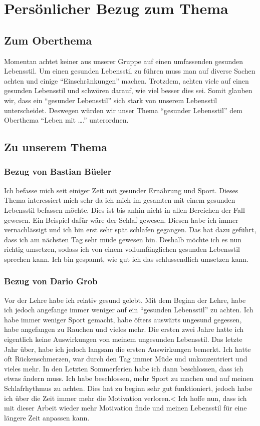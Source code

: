 \chapter{Persönlicher Bezug zum Thema}
\section{Zum Oberthema}
Momentan achtet keiner aus unserer Gruppe auf einen umfassenden gesunden Lebensstil.
Um einen gesunden Lebensstil zu führen muss man auf diverse Sachen achten und einige “Einschränkungen” machen. Trotzdem, achten viele auf einen gesunden Lebensstil und schwören darauf, wie viel besser dies sei. 
Somit glauben wir, dass ein “gesunder Lebensstil” sich stark von unserem Lebensstil unterscheidet. Deswegen würden wir unser Thema “gesunder Lebensstil” dem Oberthema “Leben mit ….” unterordnen.
\section{Zu unserem Thema}
\subsection{Bezug von Bastian Büeler}
Ich befasse mich seit einiger Zeit mit gesunder Ernährung und Sport. Dieses Thema interessiert mich sehr da ich mich im gesamten mit einem gesunden Lebensstil befassen möchte. Dies ist bis anhin nicht in allen Bereichen der Fall gewesen. Ein Beispiel dafür wäre der Schlaf gewesen. Diesen habe ich immer vernachlässigt und ich bin erst sehr spät schlafen gegangen. Das hat dazu geführt, dass ich am nächsten Tag sehr müde gewesen bin. Deshalb möchte ich es nun richtig umsetzen, sodass ich von einem vollumfänglichen gesunden Lebensstil sprechen kann. Ich bin gespannt, wie gut ich das schlussendlich umsetzen kann.
\subsection{Bezug von Dario Grob}
Vor der Lehre habe ich relativ gesund gelebt. Mit dem Beginn der Lehre, habe ich jedoch angefange immer weniger auf ein “gesunden Lebensstil” zu achten.
\newline
Ich habe immer weniger Sport gemacht, habe öfters auswärts ungesund gegessen, habe angefangen zu Rauchen und vieles mehr. 
\newline
Die ersten zwei Jahre hatte ich eigentlich keine Auswirkungen von meinem ungesunden Lebensstil. 
\newline
Das letzte Jahr über, habe ich jedoch langsam die ersten Auswirkungen bemerkt. Ich hatte oft Rückenschmerzen, war durch den Tag immer Müde und unkonzentriert und vieles mehr.
\newline
In den Letzten Sommerferien habe ich dann beschlossen, dass ich etwas ändern muss. Ich habe beschlossen, mehr Sport zu machen und auf meinen Schlafrhythmus zu achten. 
\newline
Dies hat zu beginn sehr gut funktioniert, jedoch habe ich über die Zeit immer mehr die Motivation verloren.<
\newline
Ich hoffe nun, dass ich mit dieser Arbeit wieder mehr Motivation finde und meinen Lebensstil für eine längere Zeit anpassen kann.
